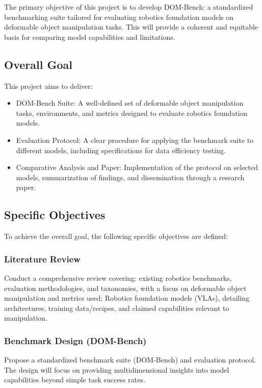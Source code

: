 The primary objective of this project is to develop DOM-Bench: a standardized benchmarking suite tailored for evaluating robotics foundation models on deformable object manipulation tasks. This will provide a coherent and equitable basis for comparing model capabilities and limitations.

\subsection{Overall Goal}

This project aims to deliver:
\begin{itemize}
    \item DOM-Bench Suite: A well-defined set of deformable object manipulation tasks, environments, and metrics designed to evaluate robotics foundation models.
    \item Evaluation Protocol: A clear procedure for applying the benchmark suite to different models, including specifications for data efficiency testing.
    \item Comparative Analysis and Paper: Implementation of the protocol on selected models, summarization of findings, and dissemination through a research paper.
\end{itemize}


\subsection{Specific Objectives}

To achieve the overall goal, the following specific objectives are defined:

\subsubsection{Literature Review} %
Conduct a comprehensive review covering: existing robotics benchmarks, evaluation methodologies, and taxonomies, with a focus on deformable object manipulation and metrics used; Robotics foundation models (VLAs), detailing architectures, training data/recipes, and claimed capabilities relevant to manipulation.

\subsubsection{Benchmark Design (DOM-Bench)}
Propose a standardized benchmark suite (DOM-Bench) and evaluation protocol. The design will focus on providing multidimensional insights into model capabilities beyond simple task success rates.


